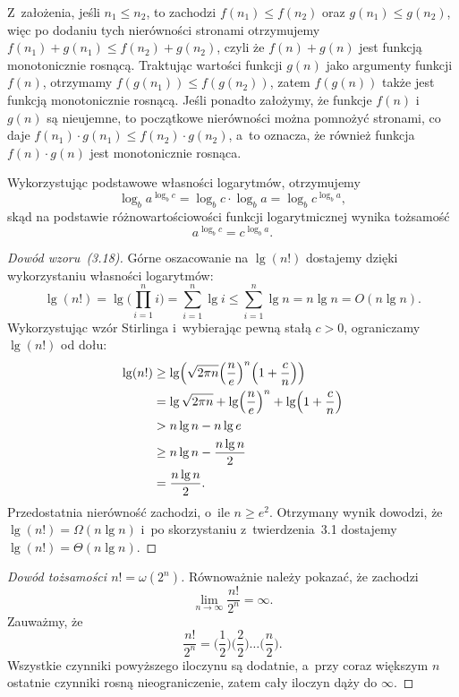 
\exercise %
Z~założenia, jeśli $n_1\le n_2$, to zachodzi $f(n_1)\le f(n_2)$ oraz $g(n_1)\le g(n_2)$, więc po dodaniu tych nierówności stronami otrzymujemy $f(n_1)+g(n_1)\le f(n_2)+g(n_2)$, czyli że $f(n)+g(n)$ jest funkcją monotonicznie rosnącą. Traktując wartości funkcji $g(n)$ jako argumenty funkcji $f(n)$, otrzymamy $f(g(n_1))\le f(g(n_2))$, zatem $f(g(n))$ także jest funkcją monotonicznie rosnącą. Jeśli ponadto założymy, że funkcje $f(n)$ i~$g(n)$ są nieujemne, to początkowe nierówności można pomnożyć stronami, co daje $f(n_1)\cdot g(n_1)\le f(n_2)\cdot g(n_2)$, a~to oznacza, że również funkcja $f(n)\cdot g(n)$ jest monotonicznie rosnąca.

\exercise %
Wykorzystując podstawowe własności logarytmów, otrzymujemy
\[
	\log_ba^{\log_bc} = \log_bc\cdot\log_ba = \log_bc^{\log_ba},
\]
skąd na podstawie różnowartościowości funkcji logarytmicznej wynika tożsamość
\[
	a^{\log_bc} = c^{\log_ba}.
\]

\exercise %
\begin{proof}[Dowód wzoru~(3.18)]
	Górne oszacowanie na $\lg(n!)$ dostajemy dzięki wykorzystaniu własności logarytmów:
	\[
	    \lg(n!) = \lg\biggl(\prod_{i=1}^ni\biggr) = \sum_{i=1}^n\lg i \le \sum_{i=1}^n\lg n = n\lg n = O(n\lg n).
	\]
	Wykorzystując wzór Stirlinga i~wybierając pewną stałą $c>0$, ograniczamy $\lg(n!)$ od dołu:
	\begin{align*}
		\lg(n!) &\ge \lg\Bigl(\sqrt{2\pi n}\Bigl(\frac{n}{e}\Bigr)^n\Bigl(1+\frac{c}{n}\Bigr)\Bigr) \\
		&= \lg\sqrt{2\pi n}+\lg\Bigl(\frac{n}{e}\Bigr)^n+\lg\Bigl(1+\frac{c}{n}\Bigr) \\
		&> n\lg n-n\lg e \\
		&\ge n\lg n-\frac{n\lg n}{2} \\
		&= \frac{n\lg n}{2}.
	\end{align*}
	Przedostatnia nierówność zachodzi, o~ile $n\ge e^2$. Otrzymany wynik dowodzi, że $\lg(n!)=\Omega(n\lg n)$ i~po skorzystaniu z~twierdzenia~3.1 dostajemy $\lg(n!)=\Theta(n\lg n)$.
\end{proof}

\begin{proof}[Dowód tożsamości $n!=\omega(2^n)$]
	Równoważnie należy pokazać, że zachodzi
	\[
		\lim_{n\to\infty}\frac{n!}{2^n} = \infty.
	\]
	Zauważmy, że
	\[
	    \frac{n!}{2^n} = \biggl(\frac{1}{2}\biggr)\biggl(\frac{2}{2}\biggr)\dots\biggl(\frac{n}{2}\biggr).
	\]
	Wszystkie czynniki powyższego iloczynu są dodatnie, a~przy coraz większym $n$ ostatnie czynniki rosną nieograniczenie, zatem cały iloczyn dąży do $\infty$.
\end{proof}

